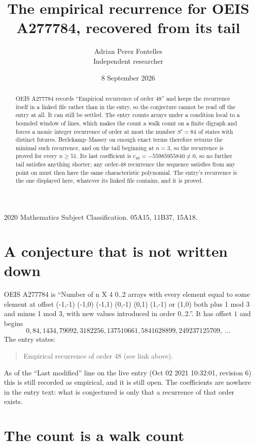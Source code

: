 \documentclass[11pt,a4paper]{article}
\title{The empirical recurrence for OEIS A277784, recovered from its tail}
\author{Adrian Perez Fontelles\\ \small Independent researcher}
\date{8 September 2026}
\theoremstyle{plain}
\theoremstyle{definition}
\begin{document}
\maketitle

\begin{abstract}
OEIS A277784 records ``Empirical recurrence of order $48$'' and keeps the recurrence itself in
a linked file rather than in the entry, so the conjecture cannot be read off the entry at all.
It can still be settled. The entry counts arrays under a condition local to a bounded window of
lines, which makes the count a walk count on a finite digraph and forces a monic integer
recurrence of order at most the number $S'=84$ of states with distinct futures. Berlekamp--Massey on
enough exact terms therefore returns the minimal such recurrence, and on the tail beginning at $n=3$, so the recurrence is proved for every $n\ge51$.
Its last coefficient is $c_{48}=-55985955840\neq0$, so no further tail satisfies anything
shorter; any order-$48$ recurrence the sequence satisfies from any point on must then have
the same characteristic polynomial. The entry's recurrence is the one displayed here, whatever
its linked file contains, and it is proved.
\end{abstract}

\noindent\small 2020 Mathematics Subject Classification. 05A15, 11B37, 15A18.\normalsize

\section{A conjecture that is not written down}

OEIS A277784 is ``Number of n X 4 0..2 arrays with every element equal to some element at offset (-1,-1) (-1,0) (-1,1) (0,-1) (0,1) (1,-1) or (1,0) both plus 1 mod 3 and minus 1 mod 3, with new values introduced in order 0..2.''. It has offset $1$ and begins
\[
0, 84, 1434, 79092, 3182256, 137510661, 5841628899, 249237125709,\ \dots
\]
The entry states:
\begin{quote}
Empirical recurrence of order 48 (see link above).
\end{quote}
As of the ``Last modified'' line on the live entry (Oct 02 2021 10:32:01, revision 6)
this is still recorded as empirical, and it is still open. The coefficients are nowhere in the
entry text: what is conjectured is only that a recurrence of that order exists.

\section{The count is a walk count}
\end{document}
